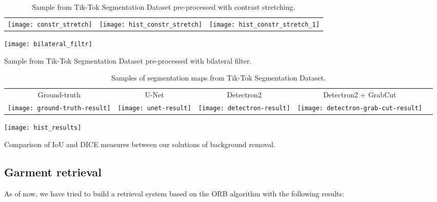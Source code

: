\FloatBarrier

\begin{table}[hbt!]
\centering
\begin{tabular}{ccc}
\texttt{[image: constr\_stretch]} & \texttt{[image: hist\_constr\_stretch]} & \texttt{[image: hist\_constr\_stretch\_1]} 
\end{tabular}
\caption{\label{contr_stretch}Sample from Tik-Tok Segmentation Dataset pre-processed with contrast stretching.}
\end{table}

\begin{table}[hbt!]
\centering
\texttt{[image: bilateral\_filtr]}
\caption{\label{bil_fil}Sample from Tik-Tok Segmentation Dataset pre-processed with bilateral filter.}
\end{table}




\begin{table}[hbt!]
\centering
\begin{tabular}{ccccc}
Ground-truth & U-Net & Detectron2 & Detectron2 + GrabCut \\
\texttt{[image: ground-truth-result]} & 
\texttt{[image: unet-result]} &
\texttt{[image: detectron-result]} &
\texttt{[image: detectron-grab-cut-result]} \\
\end{tabular}

\caption{\label{comp_results}Samples of segmentation maps from Tik-Tok Segmentation Dataset.}
\end{table}


\begin{table}[hbt!]
\centering
\texttt{[image: hist\_results]}

\caption{\label{comp_metrics}Comparison of IoU and DICE measures between our solutions of background removal.}
\end{table}



\FloatBarrier


\begin{multicols}{2}


\subsection{Garment retrieval}
As of now, we have tried to build a retrieval system based on the ORB algorithm with the following results:

\end{multicols}

